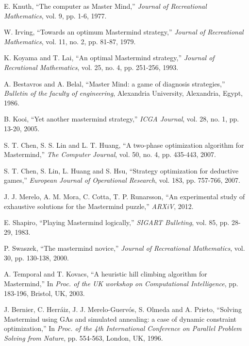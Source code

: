 \begin{thebibliography}{1}

E. Knuth, ``The computer as Master Mind,'' {\em Journal of Recreational Mathematics}, vol. 9, pp. 1-6, 1977.

W. Irving, ``Towards an optimum Mastermind strategy,'' {\em Journal of Recreational Mathematics}, vol. 11, no. 2, pp. 81-87, 1979.

K. Koyama and T. Lai, ``An optimal Mastermind strategy,'' {\em Journal of Recrational Mathematics}, vol. 25, no. 4, pp. 251-256, 1993.

A. Bestavros and A. Belal, ``Master Mind: a game of diagnosis strategies,'' {\em Bulletin of the faculty of engineering}, Alexandria University, Alexandria, Egypt, 1986.

B. Kooi, ``Yet another mastermind strategy,'' {\em ICGA Journal}, vol. 28, no. 1, pp. 13-20, 2005.

S. T. Chen, S. S. Lin and L. T. Huang, ``A two-phase optimization algorithm for Mastermind,'' {\em The Computer Journal}, vol. 50, no. 4, pp. 435-443, 2007.

S. T. Chen, S. Lin, L. Huang and S. Hsu, ``Strategy optimization for deductive games,'' {\em European Journal of Operational Research}, vol. 183, pp. 757-766, 2007.

J. J. Merelo, A. M. Mora, C. Cotta, T. P. Runarsson,
``An experimental study of exhaustive solutions for the Mastermind puzzle,''
{\em ARXiV}, 2012.


E. Shapiro, ``Playing Mastermind logically,'' {\em SIGART Bulleting}, vol. 85, pp. 28-29, 1983.

P. Swaszek, ``The mastermind novice,'' {\em Journal of Recreational Mathematics}, vol. 30, pp. 130-138, 2000.

A. Temporal and T. Kovacs, ``A heuristic hill climbing algorithm for Mastermind,'' In {\em Proc. of the UK workshop on Computational Intelligence}, pp. 183-196, Bristol, UK, 2003.

J. Bernier, C. Herr\'aiz, J. J. Merelo-Guerv\'os, S. Olmeda and A. Prieto, ``Solving Mastermind using GAs and simulated annealing: a case of dynamic constraint optimization,'' In {\em Proc. of the 4th International Conference on Parallel Problem Solving from Nature}, pp. 554-563, London, UK, 1996.


\end{thebibliography}
